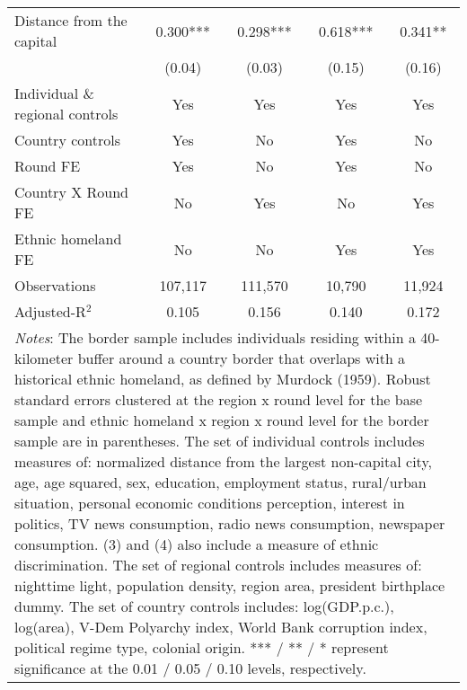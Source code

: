 \documentclass[11pt]{article}
\theoremstyle{plain}
\theoremstyle{plain}
\begin{document}
\begin{table}[H]
{\begin{tabular}{@{\extracolsep{5pt}} l c c c c}
     Distance from the capital&       0.300***&       0.298***&       0.618***&       0.341** \\
     \smallskip
     &      (0.04)   &      (0.03)   &      (0.15)   &      (0.16)   \\
     \midrule
     \smallskip
    Individual \& regional controls  & Yes & Yes & Yes & Yes  \\
    \smallskip
    Country controls & Yes& No& Yes& No\\
    \smallskip
    Round FE & Yes & No& Yes & No\\
    \smallskip
    Country X Round FE       & No & Yes& No & Yes\\
    \smallskip
    Ethnic homeland FE & No & No & Yes& Yes\\
    \smallskip
    Observations           &      107,117   &      111,570   &       10,790   &       11,924   \\
    Adjusted-R$^2$         &       0.105   &       0.156   &       0.140   &       0.172   \\
                          \bottomrule
    \multicolumn{5}{p{12.5cm}}{\footnotesize \emph{Notes}: The border sample includes individuals residing within a 40-kilometer buffer around a country border that overlaps with a historical ethnic homeland, as defined by Murdock (1959). Robust standard errors clustered at the region x round level  for the base sample and ethnic homeland x region x round level for the border sample are in parentheses. The set of individual controls
    includes measures of: normalized distance from the largest non-capital city, age, age squared, sex,
    education, employment status, rural/urban situation, personal economic conditions perception, interest in politics, TV news consumption, radio news consumption, newspaper consumption. (3) and (4) also include a measure of ethnic discrimination. The set of regional controls includes measures of: nighttime light, population density, region area, president birthplace dummy. The set of country controls includes: log(GDP.p.c.), log(area), V-Dem Polyarchy index, World Bank corruption index, political regime type, colonial origin. *** / ** / * represent significance at the 0.01 / 0.05 / 0.10 levels, respectively.}
    \end{tabular}
    }
    \end{table}
\end{document}
